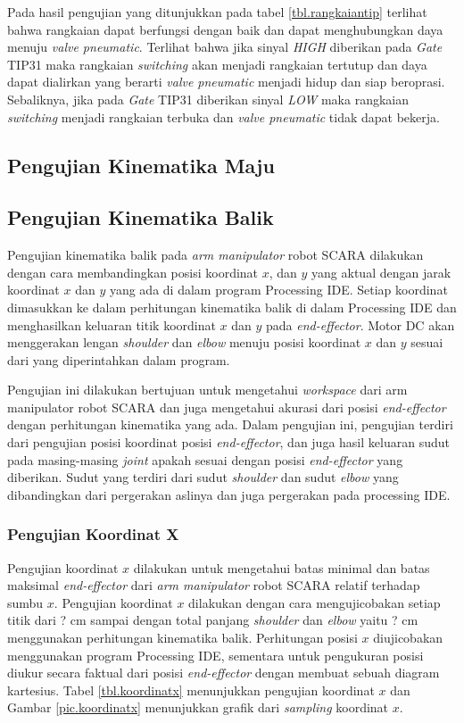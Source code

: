 Pada hasil pengujian yang ditunjukkan pada tabel \ref{tbl.rangkaiantip} terlihat bahwa rangkaian dapat berfungsi dengan baik dan dapat menghubungkan daya menuju \textit{valve pneumatic}. Terlihat bahwa jika sinyal \textit{HIGH} diberikan pada \textit{Gate} TIP31 maka rangkaian \textit{switching} akan menjadi rangkaian tertutup dan daya dapat dialirkan yang berarti \textit{valve pneumatic} menjadi hidup dan siap beroprasi. Sebaliknya, jika pada \textit{Gate} TIP31 diberikan sinyal \textit{LOW} maka rangkaian \textit{switching} menjadi rangkaian terbuka dan \textit{valve pneumatic} tidak dapat bekerja.

\subsection{Pengujian Kinematika Maju}


\subsection{Pengujian Kinematika Balik}
Pengujian kinematika balik pada \textit{arm manipulator} robot SCARA dilakukan dengan cara membandingkan posisi koordinat $x$, dan $y$ yang aktual dengan jarak koordinat $x$ dan $y$ yang ada di dalam program Processing IDE. Setiap koordinat dimasukkan ke dalam perhitungan kinematika balik di dalam Processing IDE dan menghasilkan keluaran titik koordinat $x$ dan $y$ pada \textit{end-effector}. Motor DC akan menggerakan lengan \textit{shoulder} dan \textit{elbow} menuju posisi koordinat $x$ dan $y$ sesuai dari yang diperintahkan dalam program.

 Pengujian ini dilakukan bertujuan untuk mengetahui \textit{workspace} dari arm manipulator robot SCARA dan juga mengetahui akurasi dari posisi \textit{end-effector} dengan perhitungan kinematika yang ada.
Dalam pengujian ini, pengujian terdiri dari pengujian posisi koordinat posisi \textit{end-effector}, dan juga hasil keluaran sudut pada masing-masing \textit{joint} apakah sesuai dengan posisi \textit{end-effector} yang diberikan. Sudut yang terdiri dari sudut \textit{shoulder} dan sudut \textit{elbow} yang dibandingkan dari pergerakan aslinya dan juga pergerakan pada processing IDE.  

\subsubsection{Pengujian Koordinat X}
 Pengujian koordinat $x$ dilakukan untuk mengetahui batas minimal dan batas maksimal \textit{end-effector} dari \textit{arm manipulator} robot SCARA relatif terhadap sumbu $x$. Pengujian koordinat $x$ dilakukan dengan cara mengujicobakan setiap titik dari ? cm sampai dengan total panjang \textit{shoulder} dan \textit{elbow} yaitu ? cm menggunakan perhitungan kinematika balik. Perhitungan posisi $x$ diujicobakan menggunakan program Processing IDE, sementara untuk pengukuran posisi diukur secara faktual dari posisi \textit{end-effector} dengan membuat sebuah diagram kartesius. Tabel \ref{tbl.koordinatx} menunjukkan pengujian koordinat $x$ dan Gambar \ref{pic.koordinatx} menunjukkan grafik dari \textit{sampling} koordinat $x$.
 
